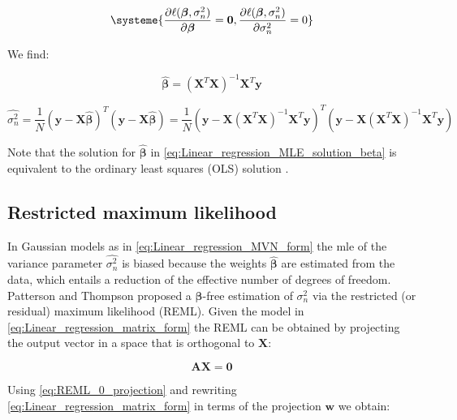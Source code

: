 \begin{equation} \label{eq:Linear_regression_MLE_system}
\systeme{
    \dfrac{\partial \ell(\boldsymbol{\beta}, \sigma_n^2)}{\partial \boldsymbol{\beta}} = \mathbf{0},
    \dfrac{\partial \ell(\boldsymbol{\beta}, \sigma_n^2)}{\partial \sigma_n^2} = 0
    }
\end{equation}

We find:

\begin{equation} \label{eq:Linear_regression_MLE_solution_beta}
\hat{\boldsymbol{\beta}} = (\mathbf{X}^T\mathbf{X})^{-1}\mathbf{X}^T\mathbf{y} 
\end{equation}

\begin{equation} \label{eq:Linear_regression_MLE_solution_sigma}
 \hat{\sigma_n^2} = \frac{1}{N}(\mathbf{y}-\mathbf{X}\hat{\boldsymbol{\beta}})^T(\mathbf{y}-\mathbf{X}\hat{\boldsymbol{\beta}}) = \frac{1}{N}(\mathbf{y}-\mathbf{X}(\mathbf{X}^T\mathbf{X})^{-1}\mathbf{X}^T\mathbf{y})^T(\mathbf{y}-\mathbf{X}(\mathbf{X}^T\mathbf{X})^{-1}\mathbf{X}^T\mathbf{y}) 
\end{equation}

Note that the solution for $\hat{\boldsymbol{\beta}}$ in \eqref{eq:Linear_regression_MLE_solution_beta} is equivalent to the ordinary least squares (OLS) solution \cite{laird2010fundamentals}.


\subsection{Restricted maximum likelihood}

In Gaussian models as in \eqref{eq:Linear_regression_MVN_form} the \gls{mle} of the variance parameter $\hat{\sigma_n^2}$ is biased because the weights $\hat{\boldsymbol{\beta}}$ are estimated from the data, which entails a reduction of the effective number of degrees of freedom.
Patterson and Thompson \cite{patterson1971recovery} proposed a $\boldsymbol{\beta}$-free estimation of $\sigma_n^2$ via the restricted (or residual) maximum likelihood (REML).
Given the model in \eqref{eq:Linear_regression_matrix_form} the REML can be obtained by projecting the output vector in a space that is orthogonal to $\mathbf{X}$:

\begin{equation}\label{eq:REML_0_projection}
    \mathbf{A}\mathbf{X} = \mathbf{0}
\end{equation}

Using \eqref{eq:REML_0_projection} and rewriting \eqref{eq:Linear_regression_matrix_form} in terms of the projection $\mathbf{w}$ we obtain:

